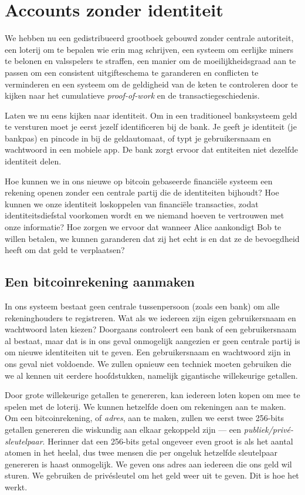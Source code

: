

\chapter{Accounts zonder identiteit}

We hebben nu een gedistribueerd grootboek gebouwd zonder centrale autoriteit, een loterij om te bepalen wie erin mag schrijven, een systeem om eerlijke miners te belonen en valsspelers te straffen, een manier om de moeilijkheidsgraad aan te passen om een consistent uitgifteschema te garanderen en conflicten te verminderen en een systeem om de geldigheid van de keten te controleren door te kijken naar het cumulatieve \textit{proof-of-work} en de transactiegeschiedenis.

Laten we nu eens kijken naar identiteit. Om in een traditioneel banksysteem geld te versturen moet je eerst jezelf identificeren bij de bank. Je geeft je identiteit (je bankpas) en pincode in bij de geldautomaat, of typt je gebruikersnaam en wachtwoord in een mobiele app. De bank zorgt ervoor dat entiteiten niet dezelfde identiteit delen.

Hoe kunnen we in ons nieuwe op bitcoin gebaseerde financiële systeem een rekening openen zonder een centrale partij die de identiteiten bijhoudt? Hoe kunnen we onze identiteit loskoppelen van financiële transacties, zodat identiteitsdiefstal voorkomen wordt en we niemand hoeven te vertrouwen met onze informatie? Hoe zorgen we ervoor dat wanneer Alice aankondigt Bob te willen betalen, we kunnen garanderen dat zij het echt is en dat ze de bevoegdheid heeft om dat geld te verplaatsen?

\section{Een bitcoinrekening aanmaken}

In ons systeem bestaat geen centrale tussenpersoon (zoals een bank) om alle rekeninghouders te registreren. Wat als we iedereen zijn eigen gebruikersnaam en wachtwoord laten kiezen? Doorgaans controleert een bank of een gebruikersnaam al bestaat, maar dat is in ons geval onmogelijk aangezien er geen centrale partij is om nieuwe identiteiten uit te geven. Een gebruikersnaam en wachtwoord zijn in ons geval niet voldoende. We zullen opnieuw een techniek moeten gebruiken die we al kennen uit eerdere hoofdstukken, namelijk gigantische willekeurige getallen. 

Door grote willekeurige getallen te genereren, kan iedereen loten kopen om mee te spelen met de loterij. We kunnen hetzelfde doen om rekeningen aan te maken. Om een bitcoinrekening, of \textit{adres}, aan te maken, zullen we eerst twee 256-bits getallen genereren die wiskundig aan elkaar gekoppeld zijn --- een \textit{publiek/privé-sleutelpaar}. Herinner dat een 256-bits getal ongeveer even groot is als het aantal atomen in het heelal, dus twee mensen die per ongeluk hetzelfde sleutelpaar genereren is haast onmogelijk. We geven ons adres aan iedereen die ons geld wil sturen. We gebruiken de privésleutel om het geld weer uit te geven. Dit is hoe het werkt.

